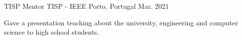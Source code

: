 
\begin{cventries}
	\cventry
		{TISP Mentor}   
		{TISP - IEEE}   
		{Porto, Portugal}        
		{Mar. 2021} 
		{
			\begin{cvitems}
				\item {Gave a presentation teaching about the university, engineering and computer science to high school students.}
			\end{cvitems}
		}
\end{cventries}

